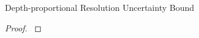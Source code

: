 \begin{theorem}{Depth-proportional Resolution Uncertainty Bound}
\label{thm:depth-proportional-resolution-algo-uncertainty-bound}

\end{theorem}

\begin{proof}
\label{prf:depth-proportional-resolution-algo-uncertainty-bound}

\end{proof}

